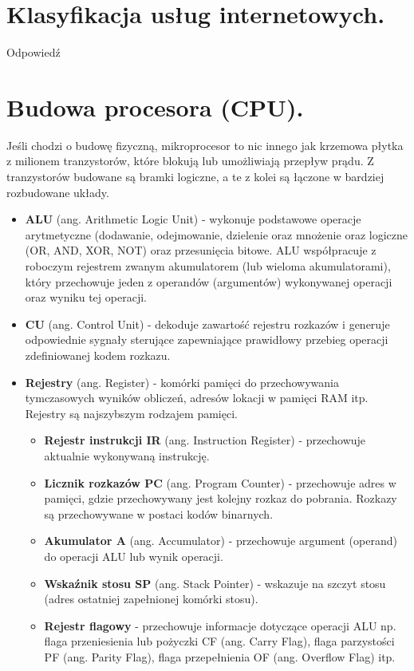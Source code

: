 \documentclass[12pt,a4paper]{article}
\begin{document}
	\section{Klasyfikacja usług internetowych.}
	Odpowiedź

	\section{Budowa procesora (CPU).}
	Jeśli chodzi o budowę fizyczną, mikroprocesor to nic innego jak krzemowa płytka z milionem tranzystorów, które blokują lub umożliwiają przepływ prądu. Z tranzystorów budowane są bramki logiczne, a te z kolei są łączone w bardziej rozbudowane układy.
	
	\begin{itemize}
		\item \textbf{ALU} (ang. Arithmetic Logic Unit) - wykonuje podstawowe operacje arytmetyczne (dodawanie, odejmowanie, dzielenie oraz mnożenie oraz logiczne (OR, AND, XOR, NOT) oraz przesunięcia bitowe. ALU współpracuje z roboczym rejestrem zwanym akumulatorem (lub wieloma akumulatorami), który przechowuje jeden z operandów (argumentów) wykonywanej operacji oraz wyniku tej operacji.
		
		\item \textbf{CU} (ang. Control Unit) - dekoduje zawartość rejestru rozkazów i generuje odpowiednie sygnały sterujące zapewniające prawidłowy przebieg operacji zdefiniowanej kodem rozkazu.
		
		\item \textbf{Rejestry} (ang. Register) - komórki pamięci do przechowywania tymczasowych wyników obliczeń, adresów lokacji w pamięci RAM itp. Rejestry są najszybszym rodzajem pamięci.
		\begin{itemize}
			\item \textbf{Rejestr instrukcji IR} (ang. Instruction Register) - przechowuje aktualnie wykonywaną instrukcję.
			\item\textbf{ Licznik rozkazów PC} (ang. Program Counter) - przechowuje adres w pamięci, gdzie przechowywany jest kolejny rozkaz do pobrania. Rozkazy są przechowywane w postaci kodów binarnych.
			\item \textbf{Akumulator A} (ang. Accumulator) - przechowuje argument (operand) do operacji ALU lub wynik operacji.
			\item \textbf{Wskaźnik stosu SP} (ang. Stack Pointer) - wskazuje na szczyt stosu (adres ostatniej zapełnionej komórki stosu).
			\item \textbf{Rejestr flagowy} - przechowuje informacje dotyczące operacji ALU np. flaga przeniesienia lub pożyczki CF (ang. Carry Flag), flaga parzystości PF (ang. Parity Flag), flaga przepełnienia OF (ang. Overflow Flag) itp.
		\end{itemize}
		

\end{itemize}
\end{document}
